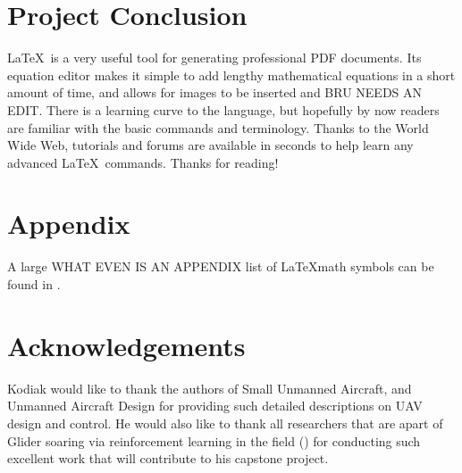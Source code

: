 \documentclass[12pt,journal,compsoc]{IEEEtran}
\begin{document}
\section{Project Conclusion}
\LaTeX\ is a very useful tool for generating professional PDF documents. Its equation editor makes it simple to add lengthy mathematical equations in a short amount of time, and allows for images to be inserted and BRU NEEDS AN EDIT. There is a learning curve to the language, but hopefully by now readers are familiar with the basic commands and terminology. Thanks to the World Wide Web, tutorials and forums are available in seconds to help learn any advanced \LaTeX\ commands. Thanks for reading!


\appendices
\section*{Appendix}
A large WHAT EVEN IS AN APPENDIX list of \LaTeX math symbols can be found in \cite{Symbols}.

\section*{Acknowledgements}
Kodiak would like to thank the authors of Small Unmanned Aircraft, and Unmanned Aircraft Design for providing such detailed descriptions on UAV design and control. He would also like to thank all researchers that are apart of Glider soaring via reinforcement learning in the field (\cite{GliderBirds}) for conducting such excellent work that will contribute to his capstone project.
\end{document}
